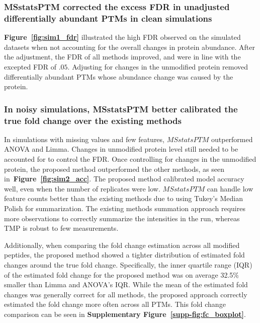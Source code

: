 \documentclass[mcp]{article}
\numberwithin{table}{section}
\def\figref#1{{\bf Figure~\ref{fig:#1}}}
\begin{document}
\subsubsection*{MSstatsPTM corrected the excess FDR in unadjusted differentially abundant PTMs in clean simulations}

\figref{sim1_fdr} illustrated the high FDR observed on the simulated datasets when not accounting for the overall changes in protein abundance. After the adjustment, the FDR of all methods improved, and were in line with the excepted FDR of $.05$. Adjusting for changes in the unmodified protein removed differentially abundant PTMs whose abundance change was caused by the protein. %

\subsubsection*{In noisy simulations, MSstatsPTM better calibrated the true fold change over the existing methods}

In simulations with missing values and few features, $MSstatsPTM$ outperformed ANOVA and Limma. Changes in unmodified protein level still needed to be accounted for to control the FDR. Once controlling for changes in the unmodified protein, the proposed method outperformed the other methods, as seen in~\figref{sim2_acc}. The proposed method calibrated model accuracy  well, even when the number of replicates were low. $MSstatsPTM$ can handle low feature counts better than the existing methods due to using Tukey's Median Polish for summarization. The existing methods summation approach requires more observations to correctly summarize the intensities in the run, whereas TMP is robust to few measurements.

Additionally, when comparing the fold change estimation across all modified peptides, the proposed method showed a tighter distribution of estimated fold changes around the true fold change. Specifically, the inner quartile range (IQR) of the estimated fold change for the proposed method was on average 32.5\% smaller than Limma and ANOVA's IQR. While the mean of the estimated fold changes was generally correct for all methods, the proposed approach correctly estimated the fold change more often across all PTMs. This fold change comparison can be seen in {\bf Supplementary Figure~\ref{supp-fig:fc_boxplot}}.
\end{document}
